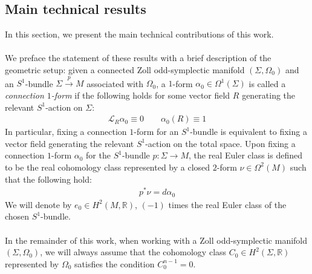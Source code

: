 \documentclass[11pt]{amsart}
\theoremstyle{plain}
\theoremstyle{definition}
\theoremstyle{remark}
\begin{document}
\subsection{Main technical results}\label{tech_results_section}
In this section, we present the main technical contributions of this work.\\
\\
We preface the statement of these results with a brief description of the geometric setup: given a connected Zoll odd-symplectic manifold $(\Sigma,\Omega_0)$ and an $S^1$-bundle $\Sigma \xrightarrow{p} M$ associated with $\Omega_0$, a $1$-form $\alpha_0 \in \Omega^1(\Sigma)$ is called a \emph{connection $1$-form} if the following holds for some vector field $R$ generating the relevant $S^1$-action on $\Sigma$:
\begin{align}
    \mathcal{L}_R\alpha_0 \equiv 0 \qquad \alpha_0(R)\equiv 1
\end{align}
In particular, fixing a connection $1$-form for an $S^1$-bundle is equivalent to fixing a vector field generating the relevant $S^1$-action on the total space. Upon fixing a connection $1$-form $\alpha_0$ for the $S^1$-bundle $p: \Sigma \rightarrow M$, the real Euler class is defined to be the real cohomology class represented by a closed $2$-form $\nu \in \Omega^2(M)$ such that the following hold:
\begin{align}
    p^*\nu = d\alpha_0
\end{align}
We will denote by $e_0 \in H^2(M,\mathbb{R})$, $(-1)$ times the real Euler class of the chosen $S^1$-bundle.\\
\\
In the remainder of this work, when working with a Zoll odd-symplectic manifold $(\Sigma,\Omega_0)$, we will always assume that the cohomology class $C_0 \in H^2(\Sigma,\mathbb{R})$ represented by $\Omega_0$ satisfies the condition $C^{n-1}_0=0$.
\end{document}

